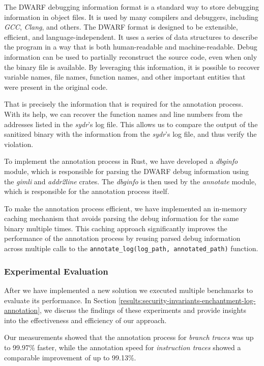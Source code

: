 The DWARF debugging information format is a standard way to store debugging information in object files. It is used by many compilers and debuggers, including \textit{GCC}, \textit{Clang}, and others. The DWARF format is designed to be extensible, efficient, and language-independent. It uses a series of data structures to describe the program in a way that is both human-readable and machine-readable. Debug information can be used to partially reconstruct the source code, even when only the binary file is available. By leveraging this information, it is possible to recover variable names, file names, function names, and other important entities that were present in the original code.

That is precisely the information that is required for the annotation process. With its help, we can recover the function names and line numbers from the addresses listed in the \textit{sydr}'s log file. This allows us to compare the output of the sanitized binary with the information from the \textit{sydr}'s log file, and thus verify the violation.


To implement the annotation process in Rust, we have developed a \textit{dbginfo} module, which is responsible for parsing the DWARF debug information using the \textit{gimli} and \textit{addr2line} crates. The \textit{dbginfo} is then used by the \textit{annotate} module, which is responsible for the annotation process itself.

To make the annotation process efficient, we have implemented an in-memory caching mechanism that avoids parsing the debug information for the same binary multiple times. This caching approach significantly improves the performance of the annotation process by reusing parsed debug information across multiple calls to the \texttt{annotate_log(log_path, annotated_path)} function.

\subsubsection{Experimental Evaluation}

After we have implemented a new solution we executed multiple benchmarks to evaluate its performance. In Section \ref{results:security-invariants-enchantment-log-annotation}, we discuss the findings of these experiments and provide insights into the effectiveness and efficiency of our approach.


Our measurements showed that the annotation process for \textit{branch traces} was up to 99.97\% faster, while the annotation speed for \textit{instruction traces} showed a comparable improvement of up to 99.13\%.

